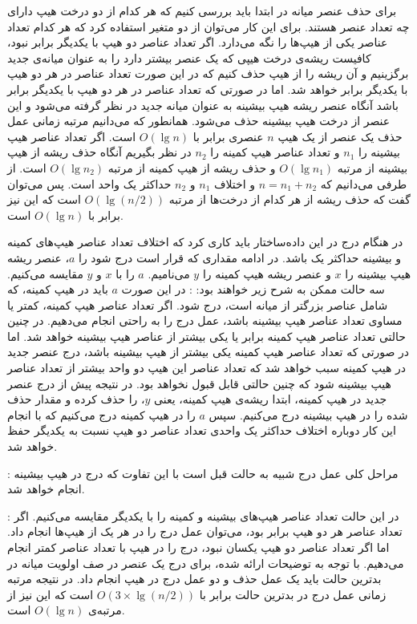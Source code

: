 برای حذف عنصر میانه در ابتدا باید بررسی کنیم که هر کدام از دو درخت هیپ‌ دارای چه تعداد عنصر هستند. برای این کار می‌توان از دو متغیر استفاده کرد که هر کدام تعداد عناصر یکی از هیپ‌ها را نگه می‌دارد. اگر تعداد عناصر دو هیپ‌ با یکدیگر برابر نبود، کافیست ریشه‌ی درخت هیپی که یک عنصر بیشتر دارد را به عنوان  میانه‌ی جدید برگزینیم و آن ریشه را از هیپ حذف کنیم که در این صورت تعداد عناصر در هر دو هیپ با یکدیگر برابر خواهد شد. اما در صورتی که تعداد عناصر در هر دو هیپ با یکدیگر برابر باشد آنگاه عنصر ریشه هیپ بیشینه به عنوان میانه جدید در نظر گرفته می‌شود و این عنصر از درخت هیپ بیشینه حذف می‌شود. همانطور که می‌دانیم مرتبه زمانی عمل حذف یک عنصر از یک هیپ {$n$} عنصری برابر با {$O(\lg n)$} است. اگر تعداد عناصر هیپ بیشینه را {$n_1$} و تعداد عناصر هیپ کمینه را {$n_2$} در نظر بگیریم آنگاه حذف ریشه از هیپ بیشینه از مرتبه {$O(\lg n_1)$} و حذف ریشه از هیپ کمینه از مرتبه‌ {$O(\lg n_2)$} است. از طرفی می‌دانیم که {$n=n_1+n_2$} و  اختلاف {$n_1$} و {$n_2$} حداکثر یک واحد است. پس می‌توان گفت که حذف ریشه از هر کدام از درخت‌ها از مرتبه {$O(\lg (n/2))$} است که این نیز برابر با {$O(\lg n)$} است.

در هنگام درج در این داده‌ساختار باید کاری کرد که اختلاف تعداد عناصر هیپ‌های کمینه و بیشینه حداکثر یک باشد. در ادامه مقداری که قرار است درج شود را {$a$}، عنصر ریشه هیپ بیشینه را {$x$} و عنصر ریشه هیپ کمینه را {$y$} می‌نامیم. {$a$} را با {$x$} و {$y$} مقایسه می‌کنیم. سه حالت ممکن به شرح زیر خواهند بود:
: در این صورت {$a$} باید در هیپ کمینه، که شامل عناصر بزرگتر از میانه است، درج شود. اگر تعداد عناصر  هیپ کمینه، کمتر یا مساوی تعداد عناصر هیپ بیشینه باشد، عمل درج را به راحتی انجام می‌دهیم. در چنین حالتی تعداد عناصر هیپ کمینه برابر یا یکی بیشتر از عناصر هیپ بیشینه خواهد شد. اما در صورتی‌ که تعداد عناصر هیپ کمینه یکی بیشتر از هیپ بیشینه باشد، درج عنصر جدید در هیپ کمینه سبب خواهد شد که تعداد عناصر این هیپ دو واحد بیشتر از تعداد عناصر هیپ بیشینه شود که چنین حالتی قابل قبول نخواهد بود. در نتیجه پیش از درج عنصر جدید در هیپ کمینه، ابتدا ریشه‌ی هیپ کمینه، یعنی {$y$}، را حذف کرده و مقدار حذف شده را در هیپ بیشینه درج می‌کنیم. سپس {$a$} را در هیپ کمینه درج می‌کنیم که با انجام این کار دوباره اختلاف حداکثر یک واحدی تعداد عناصر دو هیپ نسبت به یکدیگر حفظ خواهد شد.

: مراحل کلی عمل درج شبیه به حالت قبل است با این تفاوت که درج در هیپ بیشینه انجام خواهد شد.

: در این حالت تعداد عناصر هیپ‌های بیشینه و کمینه را با یکدیگر مقایسه می‌کنیم. اگر تعداد عناصر هر دو هیپ برابر بود، می‌توان عمل درج را در هر یک از هیپ‌ها انجام داد. اما اگر تعداد عناصر دو هیپ یکسان نبود، درج را در هیپ با تعداد عناصر کمتر انجام می‌دهیم.
با توجه به توضیحات ارائه ‌شده، برای درج یک عنصر در صف اولویت میانه در بدترین حالت باید یک عمل حذف و دو عمل درج در هیپ انجام داد. در نتیجه مرتبه زمانی عمل درج در بدترین حالت برابر با {$O(3\times \lg (n/2))$} است که این نیز از مرتبه‌ی {$O(\lg n)$} است.

